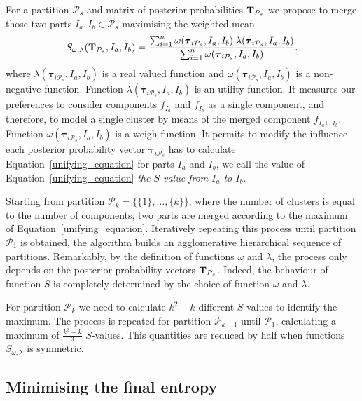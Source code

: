 \documentclass[submit]{smj}
\theoremstyle{definition}
\newcommand{\m}[1]{\boldsymbol{#1}}
\begin{document}
For a partition $\mathcal{P}_s$  and matrix of posterior probabilities $\text{\textbf{T}}_{\mathcal{P}_s}$ we propose to merge those two parts $I_a, I_b \in \mathcal{P}_s$ maximising the weighted mean
\begin{equation}\label{unifying_equation}
S_{\omega, \lambda}( \text{\textbf{T}}_{\mathcal{P}_s},  I_a,  I_b) = \frac{\sum_{i=1}^n \omega(\m\tau_{i \mathcal{P}_s}, I_a, I_b) \; \lambda(\m\tau_{i \mathcal{P}_s}, I_a, I_b)}{\sum_{i=1}^n \omega(\m\tau_{i \mathcal{P}_s}, I_a, I_b) }.
\end{equation}
where $\lambda(\m\tau_{i \mathcal{P}_s}, I_a, I_b)$ is a real valued function and $\omega(\m\tau_{i \mathcal{P}_s}, I_a, I_b)$ is a non-negative function.  Function $\lambda(\m\tau_{i \mathcal{P}_s},  I_a,  I_b)$ is an utility function. It measures our preferences to consider components $f_{I_a}$ and $f_{I_b}$ as a single component, and therefore, to model a single cluster by means of the merged component $f_{I_a \cup I_b}$. Function $\omega(\m\tau_{i \mathcal{P}_s},  I_a,  I_b)$ is a weigh function. It permits to modify the influence each posterior probability vector $\m\tau_{i \mathcal{P}_s}$ has to calculate Equation~\ref{unifying_equation} for parts $I_a$ and $I_b$, we call the value of Equation~\ref{unifying_equation} \emph{the $S$-value from $I_a$ to $I_b$}.


Starting from partition $\mathcal{P}_k = \{ \{1\}, \dots, \{k\} \}$, where the number of clusters is equal to the number of components, two parts are merged according to the maximum of Equation~\ref{unifying_equation}. Iteratively repeating this process until partition $\mathcal{P}_1$ is obtained, the algorithm builds an agglomerative hierarchical sequence of partitions. Remarkably, by the definition of functions $\omega$ and $\lambda$, the process only depends on the posterior probability vectors $\text{\textbf{T}}_{\mathcal{P}_s}$. Indeed, the behaviour of function $S$ is completely determined by the choice of function $\omega$ and $\lambda$.

For partition $\mathcal{P}_k$ we need to calculate $k^2-k$ different $S$-values to identify the maximum. The process is repeated for partition $\mathcal{P}_{k-1}$ until $\mathcal{P}_1$, calculating a maximum of $\frac{k^3-k}{3}$ $S$-values. This quantities are reduced by half when functions $S_{\omega, \lambda}$ is symmetric. 

\subsection{Minimising the final entropy}
\label{entropy_section}
\end{document}
